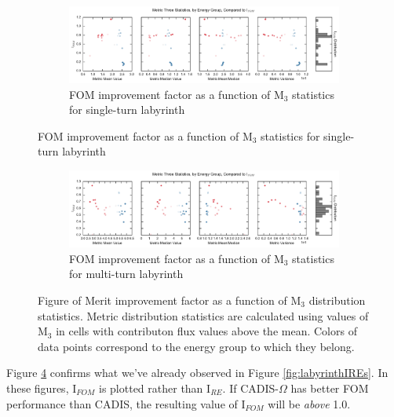 \begin{figure}[htb!]
  \centering
  \begin{subfigure}[t]{\textwidth}
    \includegraphics[width=\linewidth]{./chapters/characterization_probs/figures/char/maze2/metric_three_fom_stats_mean.pdf}
    \caption{FOM improvement factor as a function of M$_{3}$ statistics for single-turn labyrinth}
    \label{fig:maze2M3FOMs}
  \end{subfigure}
\end{figure}
\begin{figure}[htb!]\ContinuedFloat
  \centering
  \begin{subfigure}[t]{\textwidth}
    \includegraphics[width=\linewidth]{./chapters/characterization_probs/figures/char/maze1/metric_three_fom_stats_mean.pdf}
    \caption{FOM improvement factor as a function of M$_3$ statistics for multi-turn labyrinth}
    \label{fig:maze1M3FOMs}
  \end{subfigure}
  \caption[Figure of Merit improvement factor as a function of M$_3$
  distribution statistics.]
  {Figure of Merit improvement factor as a function of M$_3$
  distribution statistics. Metric distribution statistics are calculated using
  values of M$_3$ in cells with contributon flux values above the mean. Colors
  of data points correspond to the energy group to which they belong.}
  \label{fig:labyrinthIFOMs}
\end{figure}

Figure \ref{fig:labyrinthIFOMs} confirms what we've already observed in Figure
\ref{fig:labyrinthIREs}. In these figures, I$_{FOM}$ is plotted rather
than I$_{RE}$. If CADIS-$\Omega$ has better FOM performance than CADIS, the
resulting value of I$_{FOM}$ will be \textit{above} 1.0.

